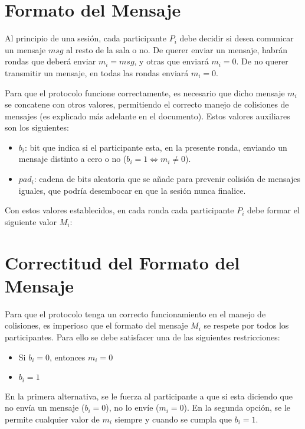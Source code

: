 
\section{Formato del Mensaje}

Al principio de una sesión, cada participante $P_i$ debe decidir si desea comunicar un mensaje $msg$ al resto de la sala o no. De querer enviar un mensaje, habrán rondas que deberá enviar $m_i = msg$, y otras que enviará $m_i = 0$. De no querer transmitir un mensaje, en todas las rondas enviará $m_i = 0$. 

Para que el protocolo funcione correctamente, es necesario que dicho mensaje $m_i$ se concatene con otros valores, permitiendo el correcto manejo de colisiones de mensajes (es explicado más adelante en el documento). Estos valores auxiliares son los siguientes:
\begin{itemize}
    \item $b_i$: bit que indica si el participante esta, en la presente ronda, enviando un mensaje distinto a cero o no ($b_i = 1 \iff m_i \neq 0$).
    \item $pad_i$: cadena de bits aleatoria que se añade para prevenir colisión de mensajes iguales, que podría desembocar en que la sesión nunca finalice.
\end{itemize}

Con estos valores establecidos, en cada ronda cada participante $P_i$ debe formar el siguiente valor $M_i$:


\section{Correctitud del Formato del Mensaje}

Para que el protocolo tenga un correcto funcionamiento en el manejo de colisiones, es imperioso que el formato del mensaje $M_i$ se respete por todos los participantes. Para ello se debe satisfacer una de las siguientes restricciones:
\begin{itemize}
    \item Si $b_i = 0$, entonces $m_i = 0$
    \item $b_i = 1$
\end{itemize}
En la primera alternativa, se le fuerza al participante a que si esta diciendo que no envía un mensaje ($b_i = 0$), no lo envíe ($m_i = 0$). En la segunda opción, se le permite cualquier valor de $m_i$ siempre y cuando se cumpla que $b_i = 1$.

